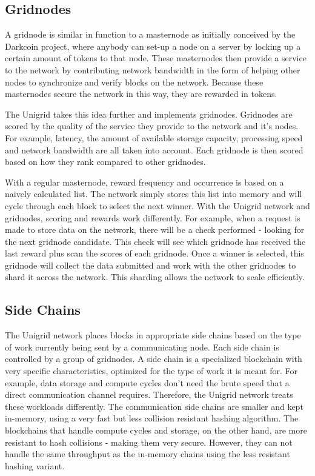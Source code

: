 \documentclass[a4paper,oneside]{article}
\begin{document}
\subsection{Gridnodes}
A gridnode is similar in function to a masternode as initially conceived by the Darkcoin project, where anybody can set-up a node on a server by locking up a certain amount of tokens to that node. These masternodes then provide a service to the network by contributing network bandwidth in the form of helping other nodes to synchronize and verify blocks on the network. Because these masternodes secure the network in this way, they are rewarded in tokens.

The Unigrid takes this idea further and implements gridnodes. Gridnodes are scored by the quality of the service they provide to the network and it's nodes. For example, latency, the amount of available storage capacity, processing speed and network bandwidth are all taken into account. Each gridnode is then scored based on how they rank compared to other gridnodes.

With a regular masternode, reward frequency and occurrence is based on a naively calculated list. The network simply stores this list into memory and will cycle through each block to select the next winner. With the Unigrid network and gridnodes, scoring and rewards work differently. For example, when a request is made to store data on the network, there will be a check performed - looking for the next gridnode candidate. This check will see which gridnode has received the last reward plus scan the scores of each gridnode. Once a winner is selected, this gridnode will collect the data submitted and work with the other gridnodes to shard it across the network. This sharding allows the network to scale efficiently.

\subsection{Side Chains}
The Unigrid network places blocks in appropriate side chains based on the type of work currently being sent by a communicating node. Each side chain is controlled by a group of gridnodes. A side chain is a specialized blockchain with very specific characteristics, optimized for the type of work it is meant for. For example, data storage and compute cycles don't need the brute speed that a direct communication channel requires. Therefore, the Unigrid network treats these workloads differently. The communication side chains are smaller and kept in-memory, using a very fast but less collision resistant hashing algorithm. The blockchains that handle compute cycles and storage, on the other hand, are more resistant to hash collisions - making them very secure. However, they can not handle the same throughput as the in-memory chains using the less resistant hashing variant.
\end{document}
